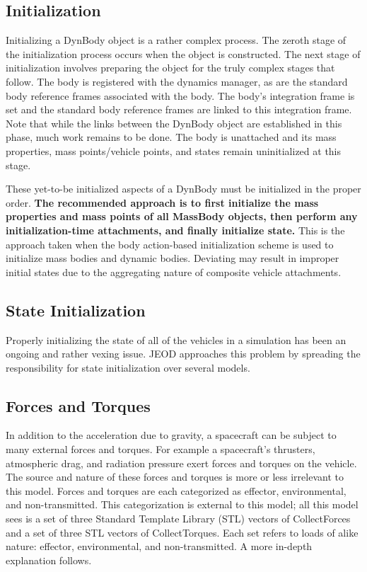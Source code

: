 \subsection*{Initialization}
Initializing a DynBody object is a rather complex process. The zeroth stage
of the initialization process occurs when the object is constructed.
The next stage of initialization involves preparing the object for the truly
complex stages that follow. The body is registered with the dynamics manager,
as are the standard body reference frames associated with the body. The
body's integration frame is set and the standard body reference frames are
linked to this integration frame. Note that while the links between the
DynBody object are established in this phase, much work remains to be done.
The body is unattached and its mass properties, mass points/vehicle points, and
states remain uninitialized at this stage.

These yet-to-be initialized aspects of a DynBody must be initialized in the
proper order. \textbf{The recommended approach is to first initialize the mass
properties and mass points of all MassBody objects, then perform any
initialization-time attachments, and finally initialize state.} This is
the approach taken when the body action-based initialization scheme is used
to initialize mass bodies and dynamic bodies. Deviating may result in improper
initial states due to the aggregating nature of composite vehicle attachments.

\subsection*{State Initialization}
Properly initializing the state of all of the vehicles in a simulation
has been an ongoing and rather vexing issue. JEOD approaches this problem by
spreading the responsibility for state initialization over several models.

\subsection*{Forces and Torques}
In addition to the acceleration due to gravity,
a spacecraft can be subject to many external forces and torques.
For example a spacecraft's thrusters, atmospheric drag, and radiation pressure
exert forces and torques on the vehicle. The source and nature of these forces
and torques is more or less irrelevant to this model.
Forces and torques are each categorized as effector, environmental, and
non-transmitted. This categorization is external to this model; all this model
sees is a set of three Standard Template Library (STL) vectors of
CollectForces and a set of three STL vectors of CollectTorques. Each set refers
 to loads of alike nature: effector, environmental, and non-transmitted.
A more in-depth explanation follows.

